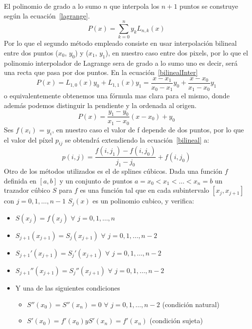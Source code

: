 \documentclass[a4paper]{article}
\begin{document}
El polinomio de grado a lo sumo $ n $ que interpola los $ n +1 $ puntos se construye según la ecuación~\ref{lagrange}.
\begin{equation}
P(x)= \sum_{k=0}^{n}y_{k}L_{n,k}(x)
\label{lagrange}
\end{equation}
Por lo que el segundo método empleado consiste en usar interpolación bilineal entre dos puntos ($ x_{0} $, $ y_{0} $) y ($ x_{1} $, $ y_{1} $), en nuestro caso entre dos pixels, por lo que el polinomio interpolador de Lagrange sera de grado a lo sumo uno es decir, será una recta que pasa por dos puntos. En la ecuación~\ref{bilinealInter}
\begin{equation}
P(x)= L_{1,0}(x)y_{0} + L_{1,1}(x)y_{1} = \frac{x -x_{1}}{x_{0}-x_{1}}y_0 + \frac{x-x_{0}}{x_{1}-x_{0}} y_{1}
\label{bilinealInter}
\end{equation}
o equivalentemente obtenemos una f\'ormula mas clara para el mismo, donde además podemos distinguir la pendiente y la ordenada al origen.
\begin{equation}
P(x)= \frac{y_{1}-y_{0}}{x_{1}-x_{0}}(x - x_{0}) + y_{0}
\label{bilineal}
\end{equation}
Ses $f(x_i)$ = $y_i$, en nuestro caso el valor de f depende de dos puntos, por lo que el valor del píxel $p_{ij}$ se obtendrá extendiendo la ecuación~\ref{bilineal} a:
\begin{equation}
p(i, j) = \frac{f(i, j_1)-f(i,j_0)}{j_1 - j_0} + f(i,j_0)
\end{equation}
Otro de los métodos utilizados es el de splines cúbicos. Dada una función $f$ definida en $[a,b]$ y un conjunto de puntos $a=x_0<x_1<\ldots<x_n=b$ un trazador cúbico $S$ para $f$ es una función tal que en cada subintervalo $[x_j, x_{j+1}]$ con  $j=0,1,\ldots,n-1$ $S_j(x)$ es un polinomio cubico, y verifica:
\begin{itemize}
  \item $S(x_j)=f(x_j)$ $ \forall $ $j=0,1,\ldots,n$
  \item $S_{j+1}(x_{j+1})=S_j(x_{j+1})$ $ \forall $ $j=0,1,\ldots,n-2$
  \item $S_{j+1}'(x_{j+1})=S_j'(x_{j+1})$ $ \forall $ $j=0,1,\ldots,n-2$
  \item $S_{j+1}''(x_{j+1})=S_j''(x_{j+1})$ $ \forall $ $j=0,1,\ldots,n-2$
  \item Y una de las siguientes condiciones
        \begin{itemize}
                \item $S''(x_0)=S''(x_n)=0$ $ \forall $ $j=0,1,\ldots,n-2$ (condición natural)
                 \item $S'(x_0)=f'(x_0) y S'(x_n)=f'(x_n)$ (condición sujeta)
        \end{itemize}
\end{itemize}
\end{document}

